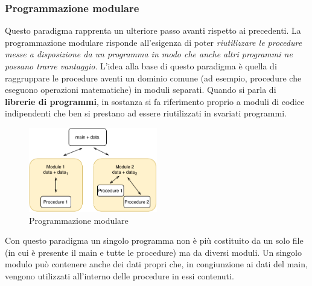 \subsubsection{Programmazione modulare}
Questo paradigma rapprenta un ulteriore passo avanti rispetto ai precedenti. La programmazione modulare risponde all'esigenza di poter \textit{riutilizzare le procedure messe a disposizione da un programma in modo che anche altri programmi ne possano trarre vantaggio}. L’idea alla base di questo paradigma è quella di raggruppare le procedure aventi un dominio comune (ad esempio, procedure che eseguono operazioni matematiche) in moduli separati. Quando si parla di \textbf{librerie di programmi}, in sostanza si fa riferimento proprio a moduli di codice indipendenti che ben si prestano ad essere riutilizzati in svariati programmi.
\begin{figure}[H]
    \centering
    \includegraphics[width=0.50\textwidth]{images/01_3_modular_programming.pdf}
    \caption{Programmazione modulare}
    \label{fig:modular-programming}
\end{figure}
Con questo paradigma un singolo programma non è più costituito da un solo file (in cui è presente il main e tutte le procedure) ma da diversi moduli. Un singolo modulo può contenere anche dei dati propri che, in congiunzione ai dati del main, vengono utilizzati all’interno delle procedure in essi contenuti.

